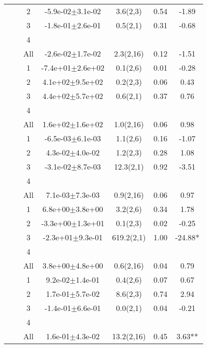 \begin{longtable}{llccccS[table-format=-2.2, table-space-text-post = {***}]}
   &  & 2 & -5.9e-02$\pm$3.1e-02 & 3.6(2,3) & 0.54 & -1.89 \\ 
   &  & 3 & -1.8e-01$\pm$2.6e-01 & 0.5(2,1) & 0.31 & -0.68 \\ 
   &  & 4 &  &  &  &  \\ 
   &  & All & -2.6e-02$\pm$1.7e-02 & 2.3(2,16) & 0.12 & -1.51 \\ 
   \midrule
{} & {} & 1 & -7.4e+01$\pm$2.6e+02 & 0.1(2,6) & 0.01 & -0.28 \\ 
   &  & 2 &  4.1e+02$\pm$9.5e+02 & 0.2(2,3) & 0.06 & 0.43 \\ 
   &  & 3 &  4.4e+02$\pm$5.7e+02 & 0.6(2,1) & 0.37 & 0.76 \\ 
   &  & 4 &  &  &  &  \\ 
   &  & All &  1.6e+02$\pm$1.6e+02 & 1.0(2,16) & 0.06 & 0.98 \\ 
   \midrule
{} & {} & 1 & -6.5e-03$\pm$6.1e-03 & 1.1(2,6) & 0.16 & -1.07 \\ 
   &  & 2 &  4.3e-02$\pm$4.0e-02 & 1.2(2,3) & 0.28 & 1.08 \\ 
   &  & 3 & -3.1e-02$\pm$8.7e-03 & 12.3(2,1) & 0.92 & -3.51 \\ 
   &  & 4 &  &  &  &  \\ 
   &  & All &  7.1e-03$\pm$7.3e-03 & 0.9(2,16) & 0.06 & 0.97 \\ 
   \midrule
{} & {} & 1 &  6.8e+00$\pm$3.8e+00 & 3.2(2,6) & 0.34 & 1.78 \\ 
   &  & 2 & -3.3e+00$\pm$1.3e+01 & 0.1(2,3) & 0.02 & -0.25 \\ 
   &  & 3 & -2.3e+01$\pm$9.3e-01 & 619.2(2,1) & 1.00 & -24.88* \\ 
   &  & 4 &  &  &  &  \\ 
   &  & All &  3.8e+00$\pm$4.8e+00 & 0.6(2,16) & 0.04 & 0.79 \\ 
   \midrule
{} & {} & 1 &  9.2e-02$\pm$1.4e-01 & 0.4(2,6) & 0.07 & 0.67 \\ 
   &  & 2 &  1.7e-01$\pm$5.7e-02 & 8.6(2,3) & 0.74 & 2.94 \\ 
   &  & 3 & -1.4e-01$\pm$6.6e-01 & 0.0(2,1) & 0.04 & -0.21 \\ 
   &  & 4 &  &  &  &  \\ 
   &  & All &  1.6e-01$\pm$4.3e-02 & 13.2(2,16) & 0.45 & 3.63** \\ 
   \midrule

\end{longtable}
